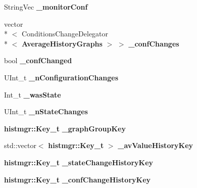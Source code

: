 \begin{DoxyCompactItemize}
\item 
String\-Vec {\bfseries \-\_\-monitor\-Conf}\label{classCALICE_1_1AverageHistoryGraphs_a98da6d927a6ed04dc03e91057181912c}

\item 
vector\\*
$<$ Conditions\-Change\-Delegator\\*
$<$ {\bf Average\-History\-Graphs} $>$ $>$ {\bfseries \-\_\-conf\-Changes}\label{classCALICE_1_1AverageHistoryGraphs_a03616ae3f8232db9aa14cbd67332cfe1}

\item 
bool {\bfseries \-\_\-conf\-Changed}\label{classCALICE_1_1AverageHistoryGraphs_acd099e4c900efbc66f69f8cce8391f03}

\item 
U\-Int\-\_\-t {\bfseries \-\_\-n\-Configuration\-Changes}\label{classCALICE_1_1AverageHistoryGraphs_aa18f88276066de50377761e7ce983cba}

\item 
Int\-\_\-t {\bfseries \-\_\-was\-State}\label{classCALICE_1_1AverageHistoryGraphs_a8cc7262ec5a99b0562f812fd014a1c26}

\item 
U\-Int\-\_\-t {\bfseries \-\_\-n\-State\-Changes}\label{classCALICE_1_1AverageHistoryGraphs_adbc2ad77c6f5945a98131e4af3cbd2ef}

\item 
{\bf histmgr\-::\-Key\-\_\-t} {\bfseries \-\_\-graph\-Group\-Key}\label{classCALICE_1_1AverageHistoryGraphs_a5b92eb7bf713fc38bb4ab6a033477be6}

\item 
std\-::vector$<$ {\bf histmgr\-::\-Key\-\_\-t} $>$ {\bfseries \-\_\-av\-Value\-History\-Key}\label{classCALICE_1_1AverageHistoryGraphs_a9b71e2d36930c41347fe49a0e8495b7d}

\item 
{\bf histmgr\-::\-Key\-\_\-t} {\bfseries \-\_\-state\-Change\-History\-Key}\label{classCALICE_1_1AverageHistoryGraphs_a1f003a748d898ea24d416211dd8b9168}

\item 
{\bf histmgr\-::\-Key\-\_\-t} {\bfseries \-\_\-conf\-Change\-History\-Key}\label{classCALICE_1_1AverageHistoryGraphs_af654242bdda2b428ba576813b6d46559}

\end{DoxyCompactItemize}
